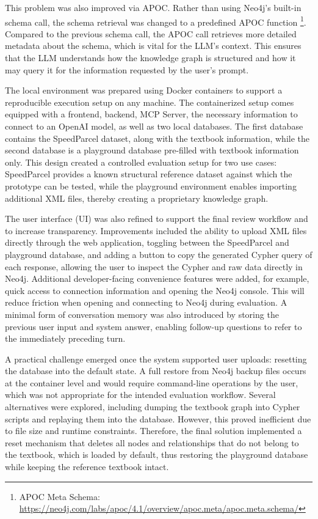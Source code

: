 This problem was also improved via APOC. Rather than using Neo4j's built-in schema call, the schema retrieval was changed to a predefined APOC function \footnote{APOC Meta Schema: \url{https://neo4j.com/labs/apoc/4.1/overview/apoc.meta/apoc.meta.schema/}}. Compared to the previous schema call, the APOC call retrieves more detailed metadata about the schema, which is vital for the LLM's context. This ensures that the LLM understands how the knowledge graph is structured and how it may query it for the information requested by the user's prompt.

The local environment was prepared using Docker containers to support a reproducible execution setup on any machine. The containerized setup comes equipped with a frontend, backend, MCP Server, the necessary information to connect to an OpenAI model, as well as two local databases. The first database contains the SpeedParcel dataset, along with the textbook information, while the second database is a playground database pre-filled with textbook information only. This design created a controlled evaluation setup for two use cases: SpeedParcel provides a known structural reference dataset against which the prototype can be tested, while the playground environment enables importing additional XML files, thereby creating a proprietary knowledge graph.

The user interface (UI) was also refined to support the final review workflow and to increase transparency. Improvements included the ability to upload XML files directly through the web application, toggling between the SpeedParcel and playground database, and adding a button to copy the generated Cypher query of each response, allowing the user to inspect the Cypher and raw data directly in Neo4j. Additional developer-facing convenience features were added, for example, quick access to connection information and opening the Neo4j console. This will reduce friction when opening and connecting to Neo4j during evaluation. A minimal form of conversation memory was also introduced by storing the previous user input and system answer, enabling follow-up questions to refer to the immediately preceding turn.

A practical challenge emerged once the system supported user uploads: resetting the database into the default state. A full restore from Neo4j backup files occurs at the container level and would require command-line operations by the user, which was not appropriate for the intended evaluation workflow. Several alternatives were explored, including dumping the textbook graph into Cypher scripts and replaying them into the database. However, this proved inefficient due to file size and runtime constraints. Therefore, the final solution implemented a reset mechanism that deletes all nodes and relationships that do not belong to the textbook, which is loaded by default, thus restoring the playground database while keeping the reference textbook intact.


